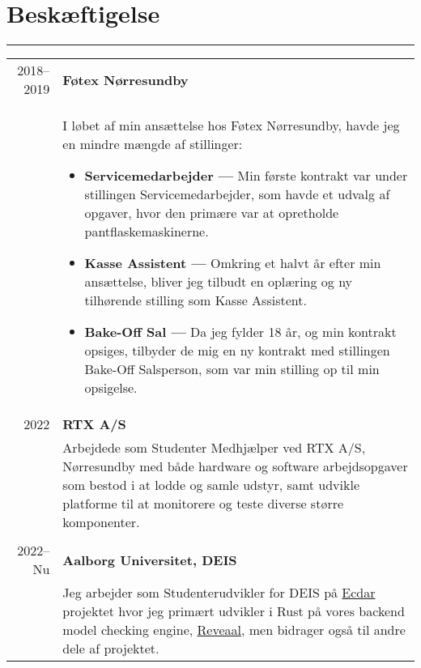 \documentclass{article}
\begin{document}
\section*{Beskæftigelse}
\hrule width5cm
\begin{longtabu} to \textwidth {r|X}
2018--2019 & \textbf{Føtex Nørresundby}\\
&   I løbet af min ansættelse hos Føtex Nørresundby, havde jeg en mindre mængde af stillinger:
    \begin{itemize}\setlength\itemsep{0em}
        \item[] \textbf{Servicemedarbejder --- } Min første kontrakt var under stillingen 
            Servicemedarbejder, som havde et udvalg af opgaver, hvor den primære var at
            opretholde pantflaskemaskinerne.
        \item[] \textbf{Kasse Assistent --- } Omkring et halvt år efter min ansættelse, bliver
            jeg tilbudt en oplæring og ny tilhørende stilling som Kasse Assistent.
        \item[] \textbf{Bake-Off Sal --- } Da jeg fylder 18 år, og min kontrakt opsiges,
            tilbyder de mig en ny kontrakt med stillingen Bake-Off Salsperson, som var min stilling
            op til min opsigelse.
    \end{itemize} \\
2022 & \textbf{RTX A/S}\\
&   Arbejdede som Studenter Medhjælper ved RTX A/S, Nørresundby med både hardware og software
    arbejdsopgaver som bestod i at lodde og samle udstyr, samt udvikle platforme til at
    monitorere og teste diverse større komponenter. \\\\
2022--Nu & \textbf{Aalborg Universitet, DEIS}\\
    &   Jeg arbejder som Studenterudvikler for DEIS på \href{https://github.com/Ecdar}{Ecdar} projektet
    hvor jeg primært udvikler i Rust på vores backend model checking engine,
    \href{https://github.com/Ecdar/Reveaal}{Reveaal}, men bidrager også til andre dele af projektet.
\end{longtabu}
\end{document}
